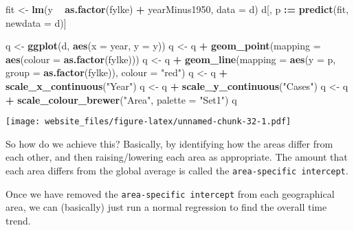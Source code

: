 \documentclass[]{book}
\newenvironment{Shaded}{\begin{snugshade}}{\end{snugshade}}
\newcommand{\KeywordTok}[1]{\textcolor[rgb]{0.13,0.29,0.53}{\textbf{#1}}}
\newcommand{\DataTypeTok}[1]{\textcolor[rgb]{0.13,0.29,0.53}{#1}}
\newcommand{\StringTok}[1]{\textcolor[rgb]{0.31,0.60,0.02}{#1}}
\newcommand{\OperatorTok}[1]{\textcolor[rgb]{0.81,0.36,0.00}{\textbf{#1}}}
\newcommand{\ErrorTok}[1]{\textcolor[rgb]{0.64,0.00,0.00}{\textbf{#1}}}
\newcommand{\NormalTok}[1]{#1}
\begin{document}
\begin{Shaded}
\begin{Highlighting}[]
\NormalTok{fit <-}\StringTok{ }\KeywordTok{lm}\NormalTok{(y }\OperatorTok{~}\StringTok{ }\KeywordTok{as.factor}\NormalTok{(fylke) }\OperatorTok{+}\StringTok{ }\NormalTok{yearMinus1950, }\DataTypeTok{data =}\NormalTok{ d)}
\NormalTok{d[, p }\OperatorTok{:}\ErrorTok{=}\StringTok{ }\KeywordTok{predict}\NormalTok{(fit, }\DataTypeTok{newdata =}\NormalTok{ d)]}

\NormalTok{q <-}\StringTok{ }\KeywordTok{ggplot}\NormalTok{(d, }\KeywordTok{aes}\NormalTok{(}\DataTypeTok{x =}\NormalTok{ year, }\DataTypeTok{y =}\NormalTok{ y))}
\NormalTok{q <-}\StringTok{ }\NormalTok{q }\OperatorTok{+}\StringTok{ }\KeywordTok{geom_point}\NormalTok{(}\DataTypeTok{mapping =} \KeywordTok{aes}\NormalTok{(}\DataTypeTok{colour =} \KeywordTok{as.factor}\NormalTok{(fylke)))}
\NormalTok{q <-}\StringTok{ }\NormalTok{q }\OperatorTok{+}\StringTok{ }\KeywordTok{geom_line}\NormalTok{(}\DataTypeTok{mapping =} \KeywordTok{aes}\NormalTok{(}\DataTypeTok{y =}\NormalTok{ p, }\DataTypeTok{group =} \KeywordTok{as.factor}\NormalTok{(fylke)), }\DataTypeTok{colour =} \StringTok{"red"}\NormalTok{)}
\NormalTok{q <-}\StringTok{ }\NormalTok{q }\OperatorTok{+}\StringTok{ }\KeywordTok{scale_x_continuous}\NormalTok{(}\StringTok{"Year"}\NormalTok{)}
\NormalTok{q <-}\StringTok{ }\NormalTok{q }\OperatorTok{+}\StringTok{ }\KeywordTok{scale_y_continuous}\NormalTok{(}\StringTok{"Cases"}\NormalTok{)}
\NormalTok{q <-}\StringTok{ }\NormalTok{q }\OperatorTok{+}\StringTok{ }\KeywordTok{scale_colour_brewer}\NormalTok{(}\StringTok{"Area"}\NormalTok{, }\DataTypeTok{palette =} \StringTok{"Set1"}\NormalTok{)}
\NormalTok{q}
\end{Highlighting}
\end{Shaded}

\texttt{[image: website\_files/figure-latex/unnamed-chunk-32-1.pdf]}

So how do we achieve this? Basically, by identifying how the areas
differ from each other, and then raising/lowering each area as
appropriate. The amount that each area differs from the global average
is called the \texttt{area-specific\ intercept}.

Once we have removed the \texttt{area-specific\ intercept} from each
geographical area, we can (basically) just run a normal regression to
find the overall time trend.
\end{document}
